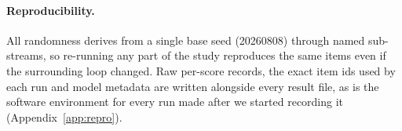 \paragraph{Reproducibility.}
All randomness derives from a single base seed (20260808) through named
sub-streams, so re-running any part of the study reproduces the same items even
if the surrounding loop changed. Raw per-score records, the exact item ids used
by each run and model metadata are written alongside every result file, as is
the software environment for every run made after we started recording it
(Appendix~\ref{app:repro}).
